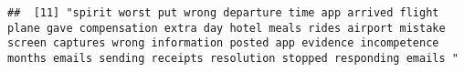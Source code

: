 \documentclass[
]{article}
\begin{document}
\begin{verbatim}
##  [11] "spirit worst put wrong departure time app arrived flight plane gave compensation extra day hotel meals rides airport mistake screen captures wrong information posted app evidence incompetence months emails sending receipts resolution stopped responding emails "                                                                                                                                                                                                                                                                                                                                                                                                                                                                                                                                                                                                                                                                                                                                                                                                                                                                                                                                                                                                                                                                                                                                                                                                                                                                                                                                                                                                                                                                                                                          

\end{verbatim}
\end{document}

